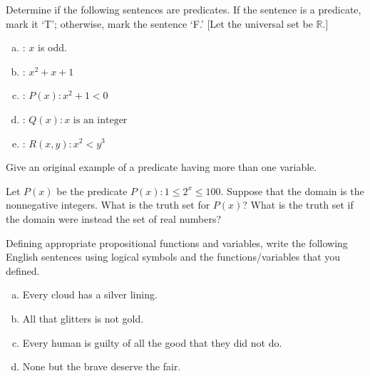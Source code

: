 \documentclass[11pt,letterpaper]{article}
\begin{document}
\homework{}

 Determine if the following sentences are predicates. If the sentence is a predicate, mark it `T'; otherwise, mark the sentence `F.' [Let the universal set be $\mathbb{R}$.]
	\begin{enumerate}[(a)]
	\item \uans{1.5cm}: $x$ is odd.
	\item \uans{1.5cm}: $x^2 + x + 1$
	\item \uans{1.5cm}: $P(x) \colon x^2 + 1 < 0$
	\item \uans{1.5cm}: $Q(x) \colon x \text{ is an integer}$
	\item \uans{1.5cm}: $R(x, y) \colon x^2 < y^3$
	\end{enumerate} 
	




\newpage





 Give an original example of a predicate having more than one variable. \pspace





\newpage





 Let $P(x)$ be the predicate $P(x) \colon 1 \leq 2^x \leq 100$. Suppose that the domain is the nonnegative integers. What is the truth set for $P(x)$? What is the truth set if the domain were instead the set of real numbers? \pspace





\newpage





 Defining appropriate propositional functions and variables, write the following English sentences using logical symbols and the functions/variables that you defined. 
        \begin{enumerate}[(a)]
        \item Every cloud has a silver lining.
        \item All that glitters is not gold. 
        \item Every human is guilty of all the good that they did not do.
        \item None but the brave deserve the fair. 
        \end{enumerate}
\end{document}
